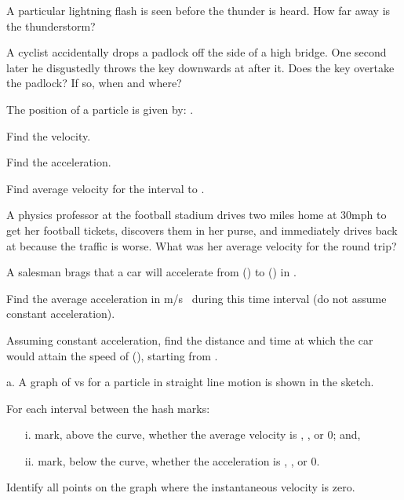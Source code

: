 {\begin{two-digit-list}
\item [12.] A particular lightning flash is seen  before the thunder is
heard.
How far away is the thunderstorm?

\item [13.] A cyclist accidentally drops a padlock off the side of a high
bridge.
One second later he disgustedly throws the key downwards at  after it.
Does the key overtake the padlock?
If so, when and where?

\item [14.] The position of a particle is given by: .
\begin{one-digit-list}
\item [a.] Find the velocity.
\item [b.] Find the acceleration.
\item [c.] Find average velocity for the interval  to .
\end{one-digit-list}

\item [15.] A physics professor at the football stadium drives two miles home at
30\unit{mph} to get her football tickets, discovers them in her purse, and
immediately drives back at  because the traffic is worse.
What was her average velocity for the round trip?

\item [16.] A salesman brags that a car will accelerate from 
() to  () in .
\begin{one-digit-list}
\item [a.] Find the average acceleration in \unit{m/s} during this time interval
(do not assume constant acceleration).
\item [b.] Assuming constant acceleration, find the distance and time at which
the car would attain the speed of  (),
starting from .
\end{one-digit-list}

\item [17.] a. A graph of  vs  for a particle in straight line motion is
shown in the sketch.


For each interval between the hash marks:
\begin{itemize}
\item [i.] mark, above the curve, whether the average velocity  is \m{+},
\m{-}, or 0; and,
\item [ii.] mark, below the curve, whether the acceleration  is \m{+}, \m{-}, or
0.
\end{itemize}
\begin{one-digit-list}
\item [b.] Identify all points on the graph where the instantaneous velocity is
zero.
\end{one-digit-list}
\end{two-digit-list}

}
